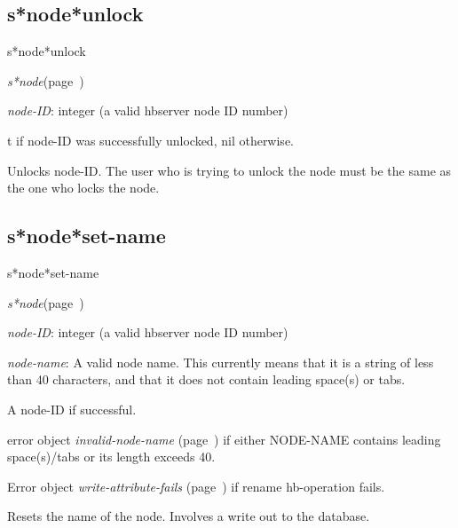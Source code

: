\subsection{s*node*unlock}
\label{s*node*unlock}

\begin{description}
\item [Name:]  s*node*unlock

\item [Class:] {\sl s*node}\hfill(page~\pageref{s*node})

\item [Parameters:] 
\item {\sl node-ID}:  
integer (a valid hbserver node ID number)
 

\item [Return-value:]
t if node-ID was successfully unlocked, nil otherwise.

\item [Description:]
Unlocks node-ID. The user who is trying to unlock the node
must be the same as the one who locks the node.

\item [Public:]



\end{description}
\horizontalline

\subsection{s*node*set-name}
\label{s*node*set-name}

\begin{description}
\item [Name:]  s*node*set-name

\item [Class:] {\sl s*node}\hfill(page~\pageref{s*node})

\item [Parameters:]
\item {\sl node-ID}:  
integer (a valid hbserver node ID number)

\item {\sl node-name}:  
A valid node name. This currently means that it is a
string of less than 40 characters, and that it does
not contain leading space(s) or tabs.


\item [Return-value:]
A node-ID if successful.

error object {\sl invalid-node-name} (page~\pageref{invalid-node-name}) if either
NODE-NAME contains leading space(s)/tabs or its
length exceeds 40.

Error object {\sl write-attribute-fails} (page~\pageref{write-attribute-fails}) if rename
hb-operation fails.

\item [Description:]
Resets the name of the node. Involves a write
out to the database.

\item [Public:]


\end{description}
\horizontalline


